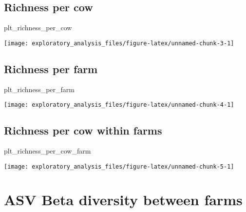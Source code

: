 \documentclass[
]{article}
\newenvironment{Shaded}{\begin{snugshade}}{\end{snugshade}}
\newcommand{\NormalTok}[1]{#1}
\begin{document}
\hypertarget{richness-per-cow}{%
\subsection{Richness per cow}\label{richness-per-cow}}

\begin{Shaded}
\begin{Highlighting}[]
\NormalTok{plt\_richness\_per\_cow}
\end{Highlighting}
\end{Shaded}

\texttt{[image: exploratory\_analysis\_files/figure-latex/unnamed-chunk-3-1]}

\hypertarget{richness-per-farm}{%
\subsection{Richness per farm}\label{richness-per-farm}}

\begin{Shaded}
\begin{Highlighting}[]
\NormalTok{plt\_richness\_per\_farm}
\end{Highlighting}
\end{Shaded}

\texttt{[image: exploratory\_analysis\_files/figure-latex/unnamed-chunk-4-1]}

\hypertarget{richness-per-cow-within-farms}{%
\subsection{Richness per cow within
farms}\label{richness-per-cow-within-farms}}

\begin{Shaded}
\begin{Highlighting}[]
\NormalTok{plt\_richness\_per\_cow\_farm}
\end{Highlighting}
\end{Shaded}

\texttt{[image: exploratory\_analysis\_files/figure-latex/unnamed-chunk-5-1]}

\hypertarget{asv-beta-diversity-between-farms}{%
\section{ASV Beta diversity between
farms}\label{asv-beta-diversity-between-farms}}
\end{document}
